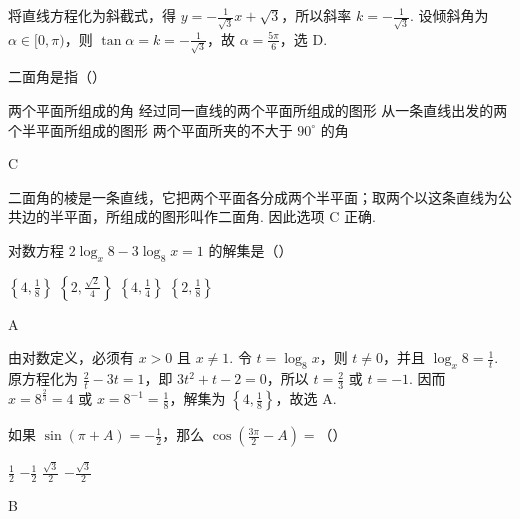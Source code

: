 \documentclass[UTF8,a4paper,oneside,11pt]{ctexbook}
\begin{document}
\begin{solution}
将直线方程化为斜截式，得 \(y=-\frac{1}{\sqrt{3}}x+\sqrt{3}\)，所以斜率 \(k=-\frac{1}{\sqrt{3}}\). 设倾斜角为 \(\alpha\in[0,\pi)\)，则 \(\tan\alpha=k=-\frac{1}{\sqrt{3}}\)，故 \(\alpha=\frac{5\pi}{6}\)，选 D.
\end{solution}

\begin{problem}
二面角是指（\quad）

\choices
    {两个平面所组成的角}
    {经过同一直线的两个平面所组成的图形}
    {从一条直线出发的两个半平面所组成的图形}
    {两个平面所夹的不大于 \(90^\circ\) 的角}
\end{problem}

\begin{answer}
C
\end{answer}

\begin{solution}
二面角的棱是一条直线，它把两个平面各分成两个半平面；取两个以这条直线为公共边的半平面，所组成的图形叫作二面角. 因此选项 C 正确.
\end{solution}

\begin{problem}
对数方程 \(2\log_{x}8-3\log_{8}x=1\) 的解集是（\quad）

\choices
    {\(\left\{4,\frac{1}{8}\right\}\)}
    {\(\left\{2,\frac{\sqrt{2}}{4}\right\}\)}
    {\(\left\{4,\frac{1}{4}\right\}\)}
    {\(\left\{2,\frac{1}{8}\right\}\)}
\end{problem}

\begin{answer}
A
\end{answer}

\begin{solution}
由对数定义，必须有 \(x>0\) 且 \(x\neq1\). 令 \(t=\log_8x\)，则 \(t\neq0\)，并且 \(\log_x8=\frac1t\). 原方程化为 \(\frac2t-3t=1\)，即 \(3t^2+t-2=0\)，所以 \(t=\frac23\) 或 \(t=-1\). 因而 \(x=8^{\frac23}=4\) 或 \(x=8^{-1}=\frac18\)，解集为 \(\left\{4,\frac18\right\}\)，故选 A.
\end{solution}

\begin{problem}
如果 \(\sin(\pi+A)=-\frac{1}{2}\)，那么 \(\cos\left(\frac{3\pi}{2}-A\right)=\)（\quad）

\choices
    {\(\frac{1}{2}\)}
    {\(-\frac{1}{2}\)}
    {\(\frac{\sqrt{3}}{2}\)}
    {\(-\frac{\sqrt{3}}{2}\)}
\end{problem}

\begin{answer}
B
\end{answer}
\end{document}
